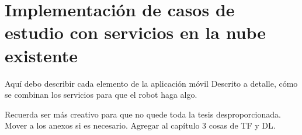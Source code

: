 
\section{Implementación de casos de estudio con servicios en la nube existente}
\label{\detokenize{chapter_two/study_cases_implementation:implementacion-de-casos-de-estudio-con-servicios-en-la-nube-existente}}\label{\detokenize{chapter_two/study_cases_implementation::doc}}

Aquí debo describir cada elemento de la aplicación móvil
Descrito a detalle, cómo se combinan los servicios para que el robot
haga algo.

Recuerda ser más creativo para que no quede toda la tesis 
desproporcionada. Mover a los anexos si es necesario.
Agregar al capítulo 3 cosas de TF y DL.
